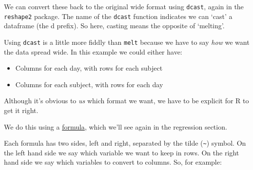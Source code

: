\documentclass[]{article}
\newenvironment{Shaded}{\begin{snugshade}}{\end{snugshade}}
\newcommand{\CommentTok}[1]{\textcolor[rgb]{0.56,0.35,0.01}{\textit{#1}}}
\newcommand{\DecValTok}[1]{\textcolor[rgb]{0.00,0.00,0.81}{#1}}
\newcommand{\FloatTok}[1]{\textcolor[rgb]{0.00,0.00,0.81}{#1}}
\newcommand{\KeywordTok}[1]{\textcolor[rgb]{0.13,0.29,0.53}{\textbf{#1}}}
\newcommand{\NormalTok}[1]{#1}
\newcommand{\OperatorTok}[1]{\textcolor[rgb]{0.81,0.36,0.00}{\textbf{#1}}}
\newcommand{\StringTok}[1]{\textcolor[rgb]{0.31,0.60,0.02}{#1}}
\providecommand{\tightlist}{%
  \setlength{\itemsep}{0pt}\setlength{\parskip}{0pt}}
\begin{document}
We can convert these back to the original wide format using \texttt{dcast}, again in
the \texttt{reshape2} package. The name of the \texttt{dcast} function indicates we can `cast'
a dataframe (the d prefix). So here, casting means the opposite of `melting'.

Using \texttt{dcast} is a little more fiddly than \texttt{melt} because we have to say \emph{how}
we want the data spread wide. In this example we could either have:

\begin{itemize}
\tightlist
\item
  Columns for each day, with rows for each subject
\item
  Columns for each subject, with rows for each day
\end{itemize}

Although it's obvious to \emph{us} which format we want, we have to be explicit for R
to get it right.

We do this using a \protect\hyperlink{formulae}{formula}, which we'll see again in the regression
section.

Each formula has two sides, left and right, separated by the tilde (\texttt{\textasciitilde{}}) symbol.
On the left hand side we say which variable we want to keep in rows. On the
right hand side we say which variables to convert to columns. So, for example:

\begin{Shaded}
\end{Shaded}
\end{document}
